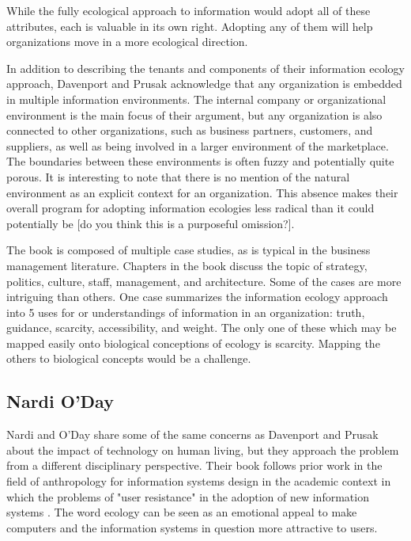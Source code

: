 While the fully ecological approach to information would adopt all of these attributes, each is valuable in its own right. Adopting any of them will help organizations move in a more ecological direction.

In addition to describing the tenants and components of their information ecology approach, Davenport and Prusak acknowledge that any organization is embedded in multiple information environments. The internal company or organizational environment is the main focus of their argument, but any organization is also connected to other organizations, such as business partners, customers, and suppliers, as well as being involved in a larger environment of the marketplace. The boundaries between these environments is often fuzzy and potentially quite porous. It is interesting to note that there is no mention of the natural environment as an explicit context for an organization. This absence makes their overall program for adopting information ecologies less radical than it could potentially be [do you think this is a purposeful omission?].

The book is composed of multiple case studies, as is typical in the business management literature. Chapters in the book discuss the topic of strategy, politics, culture, staff, management, and architecture. Some of the cases are more intriguing than others. One case summarizes the information ecology approach into 5 uses for or understandings of information in an organization: truth, guidance, scarcity, accessibility, and weight. The only one of these which may be mapped easily onto biological conceptions of ecology is scarcity. Mapping the others to biological concepts would be a challenge.

\subsection{Nardi O'Day}

Nardi and O'Day share some of the same concerns as Davenport and Prusak about the impact of technology on human living, but they approach the problem from a different disciplinary perspective. Their book follows prior work in the field of anthropology for information systems design in the academic context in which the problems of "user resistance" in the adoption of new information systems \citep{star_1996}. The word ecology can be seen as an emotional appeal to make computers and the information systems in question more attractive to users.

